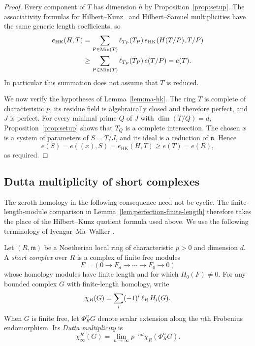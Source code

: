 \begin{proof}
Every component of $T$ has dimension $h$ by
Proposition~\ref{prop:setup}.  The associativity formulas for
Hilbert--Kunz~\cite[Theorem~3.14]{HunekeHK} and Hilbert--Samuel
multiplicities have the same
generic length coefficients, so
\begin{align*}
 e_{\mathrm{HK}}(H,T)
   &=\sum_{P\in\operatorname{Min}(T)}
       \operatorname{\ell}_{T_P}(T_P)\,
       e_{\mathrm{HK}}(H(T/P),T/P)\\
   &\geq\sum_{P\in\operatorname{Min}(T)}
       \operatorname{\ell}_{T_P}(T_P)\,e(T/P)
     =e(T).
\end{align*}
In particular this summation does not assume that $T$ is reduced.

We now verify the hypotheses of Lemma~\ref{lem:ma-hk}.  The ring $T$
is complete of characteristic $p$, its residue field is algebraically
closed and therefore perfect, and $J$ is perfect.  For every minimal
prime $Q$ of $J$ with $\dim(T/Q)=d$, Proposition~\ref{prop:setup}
shows that $T_Q$ is a complete intersection.  The chosen $x$ is a
system of parameters of $S=T/J$, and its ideal is a reduction of
$\mathfrak n$.  Hence
\[
  e(S)=e((x),S)=e_{\mathrm{HK}}(H,T)
          \geq e(T)=e(R),
\]
as required.
\end{proof}

\subsection{Dutta multiplicity of short complexes}

The zeroth homology in the following consequence need not be cyclic.
The finite-length-module comparison in
Lemma~\ref{lem:perfection-finite-length} therefore takes the place of
the Hilbert--Kunz quotient formula used above.
We use the following terminology of Iyengar--Ma--Walker
\cite[Sections~2.5--2.6]{IMW2022}.

\begin{definition}\label{def:short-complex}
Let $(R,\mathfrak m)$ be a Noetherian local ring of characteristic
$p>0$ and dimension $d$.  A \emph{short complex} over $R$ is a
complex of finite free modules
\[
 F=(0\longrightarrow F_d\longrightarrow\cdots
                 \longrightarrow F_0\longrightarrow0)
\]
whose homology modules have finite length and for which $H_0(F)\ne0$.
For any bounded complex $G$ with finite-length homology, write
\[
 \chi_R(G)=\sum_i(-1)^i\operatorname{\ell}_R H_i(G).
\]
When $G$ is finite free, let $\Phi_R^nG$ denote scalar extension
along the $n$th Frobenius endomorphism.  Its \emph{Dutta multiplicity}
is
\[
 \chi_\infty^R(G)=
 \lim_{n\longrightarrow\infty}
       p^{-nd}\chi_R(\Phi_R^nG).
\]
\end{definition}

